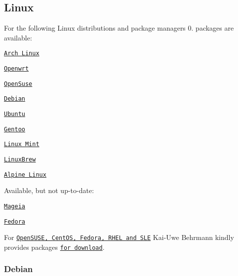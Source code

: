 \subsection*{Linux}

For the following Linux distributions and package managers 0. packages are available\+:


\begin{DoxyItemize}
\item \href{https://aur.archlinux.org/packages/elektra/}{\tt Arch Linux}
\item \href{https://github.com/openwrt/packages/tree/master/libs/elektra}{\tt Openwrt}
\item \href{https://software.opensuse.org/package/elektra}{\tt Open\+Suse}
\item \href{https://packages.debian.org/de/jessie/libelektra4}{\tt Debian}
\item \href{https://launchpad.net/ubuntu/+source/elektra}{\tt Ubuntu}
\item \href{http://packages.gentoo.org/package/app-admin/elektra}{\tt Gentoo}
\item \href{https://community.linuxmint.com/software/view/elektra-bin}{\tt Linux Mint}
\item \href{https://github.com/Linuxbrew/homebrew-core/blob/master/Formula/elektra.rb}{\tt Linux\+Brew}
\item \href{https://pkgs.alpinelinux.org/package/edge/testing/x86_64/elektra}{\tt Alpine Linux}
\end{DoxyItemize}

Available, but not up-\/to-\/date\+:


\begin{DoxyItemize}
\item \href{http://svnweb.mageia.org/packages/updates/1/elektra/}{\tt Mageia}
\item \href{https://admin.fedoraproject.org/pkgdb/package/elektra/}{\tt Fedora}
\end{DoxyItemize}

For \href{https://build.opensuse.org/package/show/home:bekun:devel/elektra}{\tt Open\+S\+U\+SE, Cent\+OS, Fedora, R\+H\+EL and S\+LE} Kai-\/\+Uwe Behrmann kindly provides packages \href{http://software.opensuse.org/download.html?project=home%3Abekun%3Adevel&package=libelektra4}{\tt for download}.

\subsubsection*{Debian}

